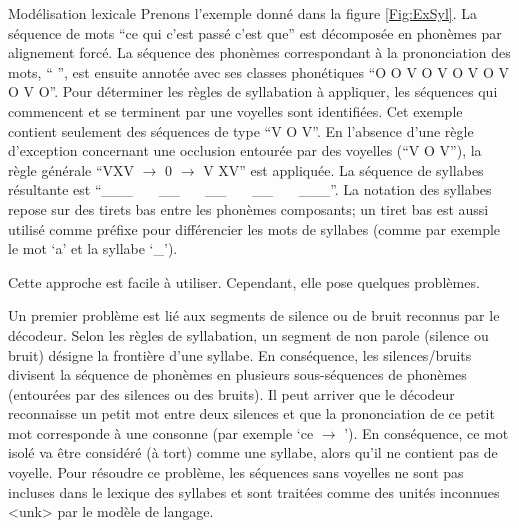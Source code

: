 \documentclass{style/these}
\begin{document}
\begin{part}{Modélisation lexicale}
Prenons l'exemple donné dans la figure \ref{Fig:ExSyl}. 
La séquence de mots ``ce qui c'est passé c'est que'' est décomposée en phonèmes par alignement forcé. 
La séquence des phonèmes correspondant à la prononciation des mots, ``           '', est ensuite annotée avec ses classes phonétiques ``O O V O V O V O V O V O''. 
Pour déterminer les règles de syllabation à appliquer, les séquences qui commencent et se terminent par une voyelles sont identifiées. 
Cet exemple contient seulement des séquences de type ``V O V''. 
En l'absence d'une règle d'exception concernant une occlusion entourée par des voyelles (``V O V''), la règle générale ``VXV $\rightarrow$ 0 $\rightarrow$ V XV'' est appliquée. 
La séquence de syllabes résultante est ``\_\_\_ \ \ \ \_\_ \ \ \ \_\_ \ \ \ \_\_ \ \ \ \_\_\_''. 
La notation des syllabes repose sur des tirets bas entre les phonèmes composants; un tiret bas est aussi utilisé comme préfixe pour différencier les mots de syllabes (comme par exemple le mot `a' et la syllabe `\_').  

Cette approche est facile à utiliser. Cependant, elle pose quelques problèmes. 

Un premier problème est lié aux segments de silence ou de bruit reconnus par le décodeur. 
Selon les règles de syllabation, un segment de non parole (silence ou bruit) désigne la frontière d'une syllabe. 
En conséquence, les silences/bruits divisent la séquence de phonèmes en plusieurs sous-séquences de phonèmes (entourées par des silences ou des bruits). 
Il peut arriver que le décodeur reconnaisse un petit mot entre deux silences et que la prononciation de ce petit mot corresponde à une consonne (par exemple `ce $\rightarrow$ '). 
En conséquence, ce mot isolé va être considéré (à tort) comme une syllabe, alors qu'il ne contient pas de voyelle. 
Pour résoudre ce problème, les séquences sans voyelles ne sont pas incluses dans le lexique des syllabes et sont traitées comme des unités inconnues <unk> par le modèle de langage.


\end{part}
\end{document}
